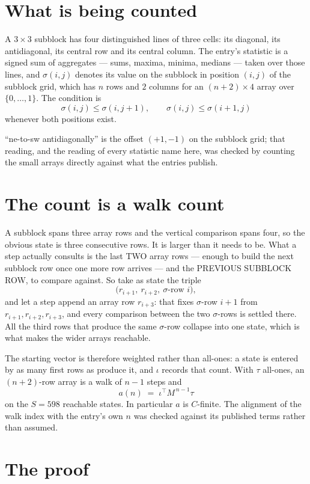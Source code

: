 \documentclass[11pt,a4paper]{article}
\theoremstyle{plain}
\theoremstyle{definition}
\begin{document}
\section{What is being counted}

A $3\times3$ subblock has four distinguished lines of three cells: its diagonal, its
antidiagonal, its central row and its central column. The entry's statistic is a signed sum of
aggregates --- sums, maxima, minima, medians --- taken over those lines, and $\sigma(i,j)$
denotes its value on the subblock in position $(i,j)$ of the subblock grid, which has $n$ rows
and $2$ columns for an $(n+2)\times4$ array over $\{0,\dots,1\}$. The condition is
\[
\sigma(i,j)\le\sigma(i,j+1),\qquad \sigma(i,j)\le\sigma(i+1,j)
\]
whenever both positions exist.

``ne-to-sw antidiagonally'' is the offset $(+1,-1)$ on the subblock grid; that reading, and
the reading of every statistic name here, was checked by counting the small arrays directly
against what the entries publish.

\section{The count is a walk count}

A subblock spans three array rows and the vertical comparison spans four, so the obvious state
is three consecutive rows. It is larger than it needs to be. What a step actually consults is
the last TWO array rows --- enough to build the next subblock row once one more row arrives ---
and the PREVIOUS SUBBLOCK ROW, to compare against. So take as state the triple
\[
\bigl(r_{i+1},\ r_{i+2},\ \sigma\text{-row }i\bigr),
\]
and let a step append an array row $r_{i+3}$: that fixes $\sigma$-row $i+1$ from
$r_{i+1},r_{i+2},r_{i+3}$, and every comparison between the two $\sigma$-rows is settled
there. All the third rows that produce the same $\sigma$-row collapse into one state, which is
what makes the wider arrays reachable.

The starting vector is therefore weighted rather than all-ones: a state is entered by as many
first rows as produce it, and $\iota$ records that count. With $\tau$ all-ones, an
$(n+2)$-row array is a walk of $n-1$ steps and
\[
a(n)\;=\;\iota^{\!\top}M^{\,n-1}\tau
\]
on the $S=598$ reachable states. In particular $a$ is $C$-finite. The alignment of the walk
index with the entry's own $n$ was checked against its published terms rather than assumed.

\section{The proof}
\end{document}
